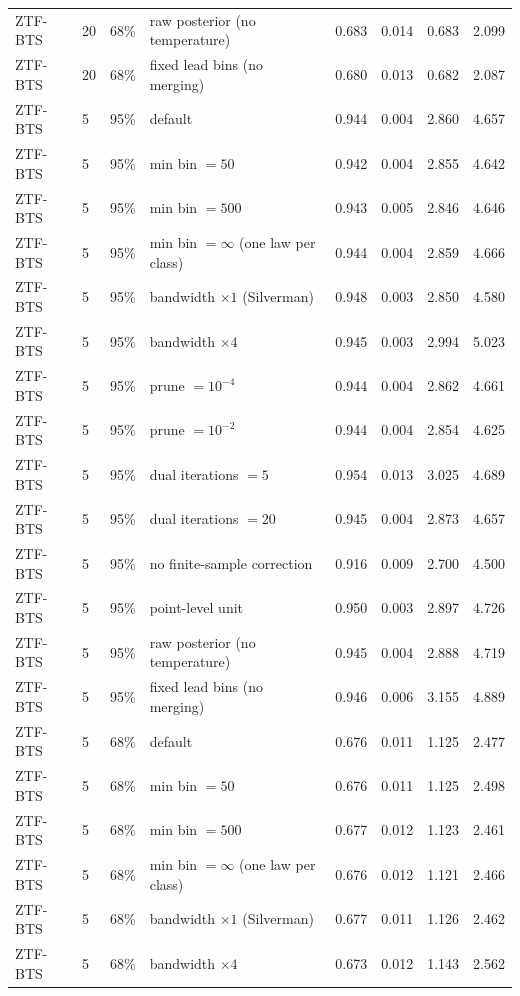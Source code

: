 \begin{longtable}{lllp{4.2cm}cccc}
ZTF-BTS & 20 & 68\% & raw posterior (no temperature) & 0.683 & 0.014 & 0.683 & 2.099 \\
ZTF-BTS & 20 & 68\% & fixed lead bins (no merging) & 0.680 & 0.013 & 0.682 & 2.087 \\
ZTF-BTS & 5 & 95\% & default & 0.944 & 0.004 & 2.860 & 4.657 \\
ZTF-BTS & 5 & 95\% & min bin $= 50$ & 0.942 & 0.004 & 2.855 & 4.642 \\
ZTF-BTS & 5 & 95\% & min bin $= 500$ & 0.943 & 0.005 & 2.846 & 4.646 \\
ZTF-BTS & 5 & 95\% & min bin $= \infty$ (one law per class) & 0.944 & 0.004 & 2.859 & 4.666 \\
ZTF-BTS & 5 & 95\% & bandwidth $\times 1$ (Silverman) & 0.948 & 0.003 & 2.850 & 4.580 \\
ZTF-BTS & 5 & 95\% & bandwidth $\times 4$ & 0.945 & 0.003 & 2.994 & 5.023 \\
ZTF-BTS & 5 & 95\% & prune $= 10^{-4}$ & 0.944 & 0.004 & 2.862 & 4.661 \\
ZTF-BTS & 5 & 95\% & prune $= 10^{-2}$ & 0.944 & 0.004 & 2.854 & 4.625 \\
ZTF-BTS & 5 & 95\% & dual iterations $= 5$ & 0.954 & 0.013 & 3.025 & 4.689 \\
ZTF-BTS & 5 & 95\% & dual iterations $= 20$ & 0.945 & 0.004 & 2.873 & 4.657 \\
ZTF-BTS & 5 & 95\% & no finite-sample correction & 0.916 & 0.009 & 2.700 & 4.500 \\
ZTF-BTS & 5 & 95\% & point-level unit & 0.950 & 0.003 & 2.897 & 4.726 \\
ZTF-BTS & 5 & 95\% & raw posterior (no temperature) & 0.945 & 0.004 & 2.888 & 4.719 \\
ZTF-BTS & 5 & 95\% & fixed lead bins (no merging) & 0.946 & 0.006 & 3.155 & 4.889 \\
ZTF-BTS & 5 & 68\% & default & 0.676 & 0.011 & 1.125 & 2.477 \\
ZTF-BTS & 5 & 68\% & min bin $= 50$ & 0.676 & 0.011 & 1.125 & 2.498 \\
ZTF-BTS & 5 & 68\% & min bin $= 500$ & 0.677 & 0.012 & 1.123 & 2.461 \\
ZTF-BTS & 5 & 68\% & min bin $= \infty$ (one law per class) & 0.676 & 0.012 & 1.121 & 2.466 \\
ZTF-BTS & 5 & 68\% & bandwidth $\times 1$ (Silverman) & 0.677 & 0.011 & 1.126 & 2.462 \\
ZTF-BTS & 5 & 68\% & bandwidth $\times 4$ & 0.673 & 0.012 & 1.143 & 2.562 \\

\end{longtable}
